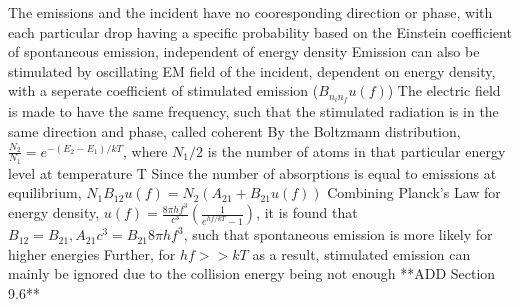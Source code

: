 \documentclass[11 pt, twoside]{article}
\newenvironment{outline*}
{
	\begin{outline}[enumerate]
	}
	{\end{outline}
}
\begin{document}
\begin{outline*}
			\4 The emissions and the incident have no cooresponding direction or phase, with each particular drop having a specific probability based on the Einstein coefficient of spontaneous emission, independent of energy density
		\3 Emission can also be stimulated by oscillating EM field of the incident, dependent on energy density, with a seperate coefficient of stimulated emission ($B_{n_in_f}u(f)$)
			\4 The electric field is made to have the same frequency, such that the stimulated radiation is in the same direction and phase, called coherent
	\2 By the Boltzmann distribution, $\frac{N_2}{N_1} = e^{-(E_2 - E_1)/kT}$, where $N_1/2$ is the number of atoms in that particular energy level at temperature T
		\3 Since the number of absorptions is equal to emissions at equilibrium, $N_1B_{12}u(f) = N_2(A_{21} + B_{21}u(f))$
		\3 Combining Planck's Law for energy density, $u(f) = \frac{8\pi hf^3}{c^3}(\frac{1}{e^{hf/kT} - 1})$, it is found that $B_{12} = B_{21}, A_{21}c^3 = B_{21}8\pi hf^3$, such that spontaneous emission is more likely for higher energies
			\4 Further, for $hf >> kT$ as a result, stimulated emission can mainly be ignored due to the collision energy being not enough
\1 **ADD Section 9.6**
\end{outline*}
\end{document}
